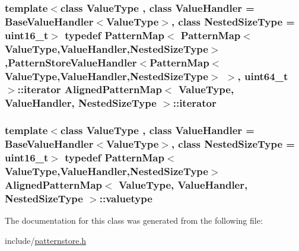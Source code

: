 \subsubsection[{iterator}]{\setlength{\rightskip}{0pt plus 5cm}template$<$class Value\+Type , class Value\+Handler  = Base\+Value\+Handler$<$\+Value\+Type$>$, class Nested\+Size\+Type  = uint16\+\_\+t$>$ typedef {\bf Pattern\+Map}$<$ {\bf Pattern\+Map}$<$Value\+Type,Value\+Handler,Nested\+Size\+Type$>$,{\bf Pattern\+Store\+Value\+Handler}$<${\bf Pattern\+Map}$<$Value\+Type,Value\+Handler,Nested\+Size\+Type$>$ $>$, uint64\+\_\+t $>$\+::{\bf iterator} {\bf Aligned\+Pattern\+Map}$<$ Value\+Type, Value\+Handler, Nested\+Size\+Type $>$\+::{\bf iterator}}\label{classAlignedPatternMap_ac784198ebf47e631d2feb1c9d6063b1b}
\hypertarget{classAlignedPatternMap_a5b139dad8d98612f62fc561a1e29153d}{}
\subsubsection[{valuetype}]{\setlength{\rightskip}{0pt plus 5cm}template$<$class Value\+Type , class Value\+Handler  = Base\+Value\+Handler$<$\+Value\+Type$>$, class Nested\+Size\+Type  = uint16\+\_\+t$>$ typedef {\bf Pattern\+Map}$<$Value\+Type,Value\+Handler,Nested\+Size\+Type$>$ {\bf Aligned\+Pattern\+Map}$<$ Value\+Type, Value\+Handler, Nested\+Size\+Type $>$\+::{\bf valuetype}}\label{classAlignedPatternMap_a5b139dad8d98612f62fc561a1e29153d}


The documentation for this class was generated from the following file\+:\begin{DoxyCompactItemize}
\item 
include/\hyperlink{patternstore_8h}{patternstore.\+h}\end{DoxyCompactItemize}
